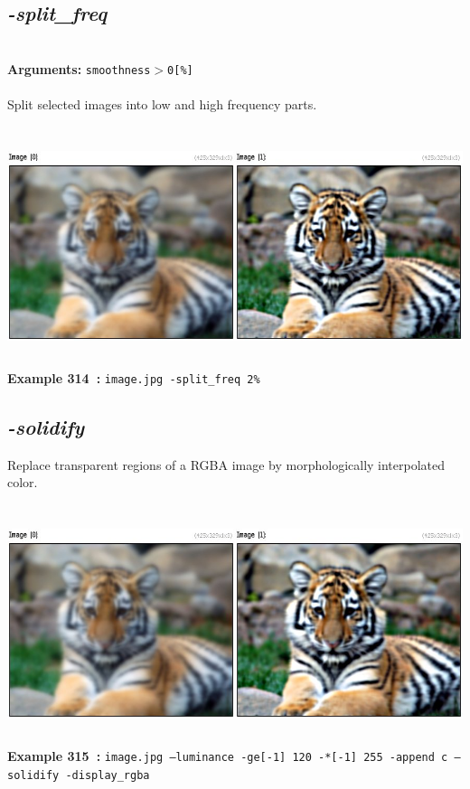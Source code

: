 \documentclass[a4paper,11pt,twoside]{book}
\begin{document}
\subsection{\emph{-split\_freq} }\vspace*{-0.5em}
~\\\textbf{Arguments: } 
{\small \texttt{smoothness$>$0[\%]}}\\~\\
Split selected images into low and high frequency parts.
\begin{center}\includegraphics[keepaspectratio=true,height=7cm,width=\textwidth]{img/gmic_def314.jpg}\\
{\footnotesize \textbf{Example 314~:} \texttt{image.jpg -split\_freq 2\%}}
\end{center}

\subsection{\emph{-solidify} }\vspace*{-0.5em}
Replace transparent regions of a RGBA image by morphologically interpolated color.
\begin{center}\includegraphics[keepaspectratio=true,height=7cm,width=\textwidth]{img/gmic_def315.jpg}\\
{\footnotesize \textbf{Example 315~:} \texttt{image.jpg --luminance -ge[-1] 120 -*[-1] 255 -append c --solidify -display\_rgba}}
\end{center}
\end{document}
